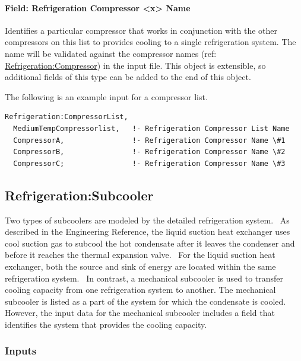 \paragraph{Field: Refrigeration Compressor \textless{}x\textgreater{} Name}\label{field-refrigeration-compressor-x-name}

Identifies a particular compressor that works in conjunction with the other compressors on this list to provides cooling to a single refrigeration system. The name will be validated against the compressor names (ref: \hyperref[refrigerationcompressor]{Refrigeration:Compressor}) in the input file.  This object is extensible, so additional fields of this type can be added to the end of this object.

The following is an example input for a compressor list.

\begin{lstlisting}
Refrigeration:CompressorList,
  MediumTempCompressorlist,   !- Refrigeration Compressor List Name
  CompressorA,                !- Refrigeration Compressor Name \#1
  CompressorB,                !- Refrigeration Compressor Name \#2
  CompressorC;                !- Refrigeration Compressor Name \#3
\end{lstlisting}

\subsection{Refrigeration:Subcooler}\label{refrigerationsubcooler}

Two types of subcoolers are modeled by the detailed refrigeration system.~ As described in the Engineering Reference, the liquid suction heat exchanger uses cool suction gas to subcool the hot condensate after it leaves the condenser and before it reaches the thermal expansion valve.~ For the liquid suction heat exchanger, both the source and sink of energy are located within the same refrigeration system.~ In contrast, a mechanical subcooler is used to transfer cooling capacity from one refrigeration system to another. The mechanical subcooler is listed as a part of the system for which the condensate is cooled.~ However, the input data for the mechanical subcooler includes a field that identifies the system that provides the cooling capacity.

\subsubsection{Inputs}\label{inputs-7-020}

